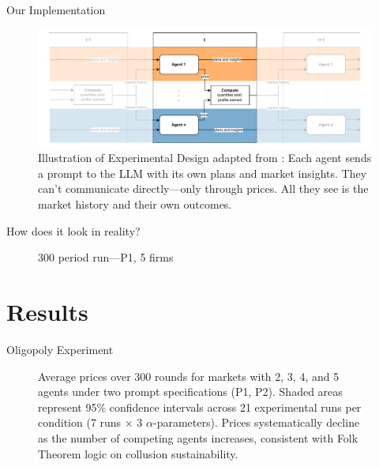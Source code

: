 \documentclass[10pt, aspectratio=169]{beamer}
\begin{document}
\begin{frame}[fragile]{Our Implementation}\label{experiment}
    \begin{figure}[htpb!]
      \centering
      \includegraphics[width=1\linewidth]{latex/imgs/illustration_diagram_experiment.pdf}
        \caption{Illustration of Experimental Design adapted from \textcite[p. 9]{fish_algorithmic_2025}: Each agent sends a prompt to the LLM with its own plans and market insights. They can't communicate directly—only through prices. All they see is the market history and their own outcomes.\\
        \hfill\hyperlink{app:prompts}{}}
        \label{fig:experimental_design}
    \end{figure}
\end{frame}


\begin{frame}{How does it look in reality?}
    \begin{figure}
        \centering
        \caption{300 period run---P1, 5 firms}
        \label{fig:run}
    \end{figure}
\end{frame}


\section{Results}



\begin{frame}{Oligopoly Experiment}
    \begin{figure}[htpb!]
        \centering
        
        \caption{Average prices over 300 rounds for markets with 2, 3, 4, and 5 agents under two prompt specifications (P1, P2). Shaded areas represent 95\% confidence intervals across 21 experimental runs per condition (7 runs × 3 $\alpha$-parameters). Prices systematically decline as the number of competing agents increases, consistent with Folk Theorem logic on collusion sustainability.}
        \label{fig:ts_prices_comb}
    \end{figure}
\end{frame}
\end{document}
